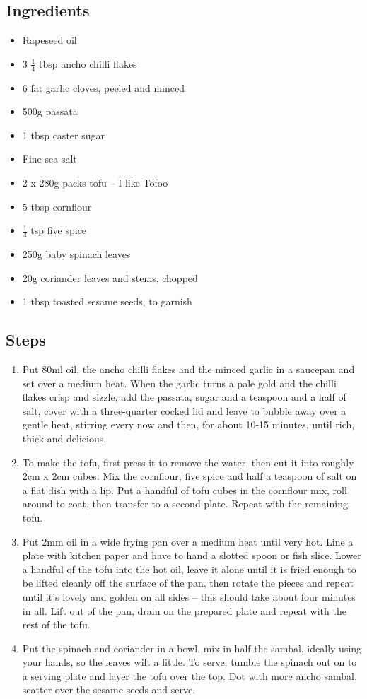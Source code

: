 \documentclass{book}
\begin{document}
\subsection*{Ingredients}
\begin{itemize}
\item Rapeseed oil
\item 3 $\frac{1}{4}$ tbsp ancho chilli flakes
\item 6 fat garlic cloves, peeled and minced
\item 500g passata
\item 1 tbsp caster sugar
\item Fine sea salt
\item 2 x 280g packs tofu – I like Tofoo
\item 5 tbsp cornflour
\item $\frac{1}{4}$ tsp five spice
\item 250g baby spinach leaves
\item 20g coriander leaves and stems, chopped
\item 1 tbsp toasted sesame seeds, to garnish
\end{itemize}

\subsection*{Steps}
\begin{enumerate}
\item Put 80ml oil, the ancho chilli flakes and the minced garlic in a saucepan and set over a medium heat. When the garlic turns a pale gold and the chilli flakes crisp and sizzle, add the passata, sugar and a teaspoon and a half of salt, cover with a three-quarter cocked lid and leave to bubble away over a gentle heat, stirring every now and then, for about 10-15 minutes, until rich, thick and delicious.
\item To make the tofu, first press it to remove the water, then cut it into roughly 2cm x 2cm cubes. Mix the cornflour, five spice and half a teaspoon of salt on a flat dish with a lip. Put a handful of tofu cubes in the cornflour mix, roll around to coat, then transfer to a second plate. Repeat with the remaining tofu.
\item Put 2mm oil in a wide frying pan over a medium heat until very hot. Line a plate with kitchen paper and have to hand a slotted spoon or fish slice. Lower a handful of the tofu into the hot oil, leave it alone until it is fried enough to be lifted cleanly off the surface of the pan, then rotate the pieces and repeat until it’s lovely and golden on all sides – this should take about four minutes in all. Lift out of the pan, drain on the prepared plate and repeat with the rest of the tofu.
\item Put the spinach and coriander in a bowl, mix in half the sambal, ideally using your hands, so the leaves wilt a little. To serve, tumble the spinach out on to a serving plate and layer the tofu over the top. Dot with more ancho sambal, scatter over the sesame seeds and serve.
\end{enumerate}
\newpage
\end{document}
